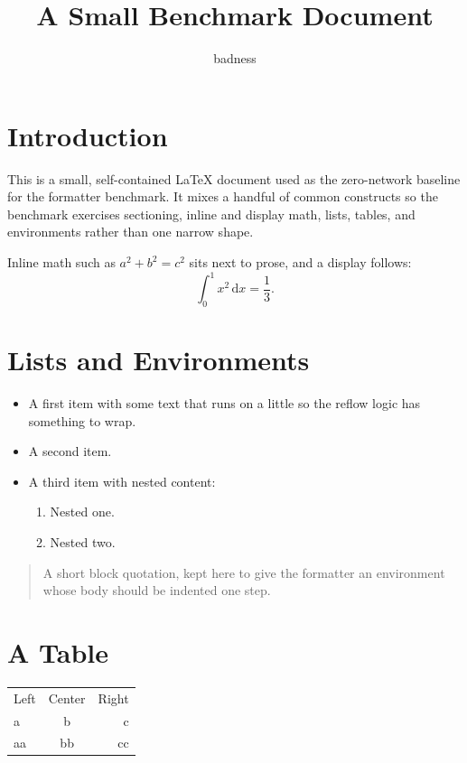 \documentclass{article}
\title{A Small Benchmark Document}
\author{badness}
\begin{document}
\maketitle

\section{Introduction}

This is a small, self-contained \LaTeX{} document used as the zero-network
baseline for the formatter benchmark. It mixes a handful of common constructs so
the benchmark exercises sectioning, inline and display math, lists, tables, and
environments rather than one narrow shape.

Inline math such as $a^2 + b^2 = c^2$ sits next to prose, and a display follows:
\begin{equation}
    \int_0^1 x^2 \, \mathrm{d}x = \frac{1}{3}.
\end{equation}

\section{Lists and Environments}

\begin{itemize}
    \item A first item with some text that runs on a little so the reflow logic
          has something to wrap.
    \item A second item.
    \item A third item with nested content:
        \begin{enumerate}
            \item Nested one.
            \item Nested two.
        \end{enumerate}
\end{itemize}

\begin{quote}
    A short block quotation, kept here to give the formatter an environment whose
    body should be indented one step.
\end{quote}

\section{A Table}

\begin{tabular}{lcr}
    Left & Center & Right \\
    a & b & c \\
    aa & bb & cc \\
\end{tabular}
\end{document}
